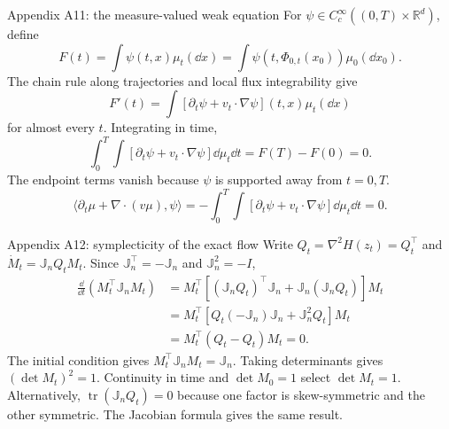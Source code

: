 \begin{frame}[t]{Appendix A11: the measure-valued weak equation}
\hypertarget{app:weak}{}
For $\psi\in C_c^\infty((0,T)\times\mathbb R^d)$, define
\begin{equation*}
  F(t)=\int\psi(t,x)\mu_t(\dd x)
  =\int\psi(t,\Phi_{0,t}(x_0))\mu_0(\dd x_0).
\end{equation*}
The chain rule along trajectories and local flux integrability give
\begin{equation*}
  F'(t)=\int[\partial_t\psi+v_t\cdot\nabla\psi](t,x)\mu_t(\dd x)
\end{equation*}
for almost every $t$. Integrating in time,
\begin{equation*}
  \int_0^T\int[\partial_t\psi+v_t\cdot\nabla\psi]\dd\mu_t\dd t=F(T)-F(0)=0.
\end{equation*}
The endpoint terms vanish because $\psi$ is supported away from $t=0,T$.
\begin{equation*}
  \langle\partial_t\mu+\nabla\cdot(v\mu),\psi\rangle
  =-\int_0^T\int[\partial_t\psi+v_t\cdot\nabla\psi]\dd\mu_t\dd t=0.
\end{equation*}
\end{frame}

\begin{frame}[t]{Appendix A12: symplecticity of the exact flow}
\hypertarget{app:symplectic}{}
Write $Q_t=\nabla^2H(z_t)=Q_t^\top$ and $\dot M_t=\mathbb J_nQ_tM_t$.
Since $\mathbb J_n^\top=-\mathbb J_n$ and $\mathbb J_n^2=-I$,
\begin{equation*}
  \begin{aligned}
    \frac{\dd}{\dd t}(M_t^\top\mathbb J_nM_t)
    &=M_t^\top[(\mathbb J_nQ_t)^\top\mathbb J_n
      +\mathbb J_n(\mathbb J_nQ_t)]M_t\\
    &=M_t^\top[Q_t(-\mathbb J_n)\mathbb J_n+\mathbb J_n^2Q_t]M_t\\
    &=M_t^\top(Q_t-Q_t)M_t=0.
  \end{aligned}
\end{equation*}
The initial condition gives $M_t^\top\mathbb J_nM_t=\mathbb J_n$.
Taking determinants gives $(\det M_t)^2=1$. Continuity in time and $\det M_0=1$
select $\det M_t=1$.
\medskip
Alternatively, $\operatorname{tr}(\mathbb J_nQ_t)=0$ because one factor is
skew-symmetric and the other symmetric. The Jacobian formula gives the same result.
\end{frame}


